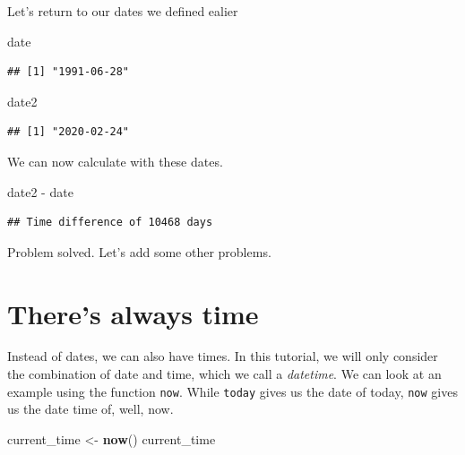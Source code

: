 \documentclass[]{tufte-book}
\newenvironment{Shaded}{}{}
\newcommand{\KeywordTok}[1]{\textcolor[rgb]{0.00,0.44,0.13}{\textbf{#1}}}
\newcommand{\NormalTok}[1]{#1}
\newcommand{\OperatorTok}[1]{\textcolor[rgb]{0.40,0.40,0.40}{#1}}
\newcommand{\StringTok}[1]{\textcolor[rgb]{0.25,0.44,0.63}{#1}}
\begin{document}
Let's return to our dates we defined ealier

\begin{Shaded}
\begin{Highlighting}[]
\NormalTok{date}
\end{Highlighting}
\end{Shaded}

\begin{verbatim}
## [1] "1991-06-28"
\end{verbatim}

\begin{Shaded}
\begin{Highlighting}[]
\NormalTok{date2}
\end{Highlighting}
\end{Shaded}

\begin{verbatim}
## [1] "2020-02-24"
\end{verbatim}

We can now calculate with these dates.

\begin{Shaded}
\begin{Highlighting}[]
\NormalTok{date2 }\OperatorTok{-}\StringTok{ }\NormalTok{date}
\end{Highlighting}
\end{Shaded}

\begin{verbatim}
## Time difference of 10468 days
\end{verbatim}

Problem solved. Let's add some other problems.

\hypertarget{theres-always-time}{%
\section{There's always time}\label{theres-always-time}}

Instead of dates, we can also have times. In this tutorial, we will only consider the combination of date and time, which we call a \emph{datetime}. We can look at an example using the function \texttt{now}. While \texttt{today} gives us the date of today, \texttt{now} gives us the date time of, well, now.

\begin{Shaded}
\begin{Highlighting}[]
\NormalTok{current_time <-}\StringTok{ }\KeywordTok{now}\NormalTok{()}
\NormalTok{current_time}
\end{Highlighting}
\end{Shaded}
\end{document}
